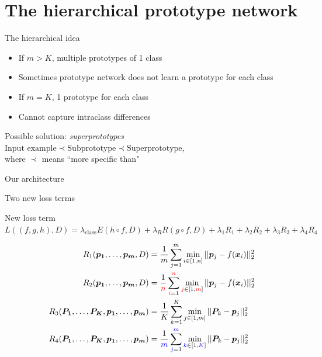 \documentclass{beamer}[169]
\begin{document}
\section{The hierarchical prototype network}
\begin{frame}{The hierarchical idea}
\begin{itemize}
    \item If $m>K$, multiple prototypes of 1 class 
    \item Sometimes prototype network does not learn a prototype for each class
    \item If $m=K$, 1 prototype for each class
    \item Cannot capture intraclass differences
\end{itemize}
\pause 
\begin{block}{Possible solution: \emph{superprototypes}}
 $ \text{Input example}\prec \text{Subprototype}\prec \text{Superprototype}$, \\
    where $\prec$ means ``more specific than"
\end{block}

\end{frame}

\begin{frame}{Our architecture}
    
\end{frame}

\begin{frame}{Two new loss terms}
\begin{block}{New loss term}
$L((f,g,h),D) = \lambda_{\text{class}}E(h \circ f, D) + \lambda_R R(g \circ f,D) + \lambda_1 R_1 + \lambda_2 R_2 + \lambda_3 R_3 + \lambda_4 R_4$
\end{block}
 \begin{align*}
R_1(\bm{p_1}, \dots, \bm{p_m}, D) &= \frac{1}{m}\sum_{j=1}^m \min_{i\in [1,n]}||\bm{p}_j- f(\bm{x}_i)||^2_2 \\
      R_2(\bm{p_1},  \dots, \bm{p_m}, D) &= \frac{1}{{\color{red}n}}\sum_{{\color{red}i}=1}^{{\color{red}n}} \min_{{\color{red}j}\in [1,{\color{red}m}]}||\bm{p}_j- f(\bm{x}_i)||^2_2\\
     R_3(\bm{P_1}, \dots, \bm{P_K}, \bm{p_1}, \dots, \bm{p_m}) &= \frac{1}{K}\sum_{k=1}^K \min_{j\in [1,m]}||\bm{P}_k- \bm{p}_j||^2_2 \\
    R_4(\bm{P_1}, \dots, \bm{P_K}, \bm{p_1}, \dots, \bm{p_m}) &= \frac{1}{{\color{blue}m}}\sum_{{\color{blue}j}=1}^{{\color{blue}m}} \min_{{\color{blue}k}\in [1,{\color{blue}K}]}||\bm{P}_k- \bm{p}_j||^2_2
 \end{align*}
\end{frame}
\end{document}
